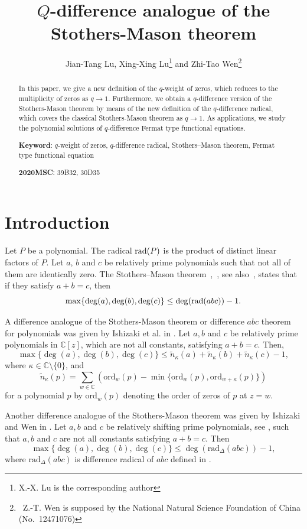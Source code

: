 \documentclass[a4paper,12pt]{article}
\title{$Q$-difference analogue of the Stothers-Mason theorem}
\author{Jian-Tang Lu, Xing-Xing Lu\footnote{X.-X. Lu is the corresponding author} and Zhi-Tao Wen\footnote{\ Z.-T. Wen is supposed by the National Natural Science Foundation of China (No.~12471076)}
 }
\date{}
\newcommand{\C}{\mathbb{C}}
\numberwithin{equation}{section}
\begin{document}
\maketitle

\begin{abstract}

In this paper, we give a new definition of the $q$-weight of zeros,  which reduces to the multiplicity of zeros as $q\to 1$. Furthermore, we obtain a $q$-difference version of the Stothers-Mason theorem by means of the new definition of the $q$-difference radical, which covers the classical Stothers-Mason theorem as $q\to 1$. As applications, we study the polynomial solutions of $q$-difference Fermat type functional equations.

\medskip
\noindent
\textbf{Keyword}: $q$-weight of zeros, $q$-difference radical, Stothers--Mason theorem, Fermat type functional equation

\medskip
\noindent
\textbf{2020MSC}: 39B32, 30D35

\end{abstract}

\section{Introduction}
Let $P$ be a polynomial. The radical ${\rm rad}(P)$ is the product of distinct linear factors of $P$. Let $a$, $b$ and $c$ be relatively prime polynomials such that not all of them are identically zero. The Stothers--Mason theorem~\cite{mason1984},~\cite{stothers1981}, see also~\cite{Snyder}, states that if they satisfy $a+b=c$, then
    $$
    \max\{\deg(a),\deg(b),\deg(c)\}\leq \deg({\rm rad}(abc))-1.
    $$

A difference analogue of the Stothers-Mason theorem or difference $abc$ theorem for polynomials was given by Ishizaki et al. in \cite[Theorem~3.1]{IKLT}. Let $a,b$ and $c$ be relatively prime polynomials in $\C[z]$, which are not all constants, satisfying $a+b=c$. Then,
    $$
    \max\{\deg(a),\deg(b),\deg(c)\}\leq \tilde{n}_\kappa(a)+\tilde{n}_\kappa(b)+\tilde{n}_\kappa(c)-1,
    $$
where $\kappa\in\C\setminus\{0\}$, and
    $$
    \tilde{n}_\kappa(p)=\sum_{w\in\C}(\text{ord}_w(p)-\min\{\text{ord}_w(p),\text{ord}_{w+\kappa}(p)\})
    $$
for a polynomial $p$ by $\text{ord}_w(p)$ denoting the order of zeros of $p$ at $z=w$.

Another difference analogue of the Stothers-Mason theorem was given by Ishizaki and Wen in \cite[Theorem~3.5]{IW2022}. Let $a, b$ and $c$ be relatively shifting prime polynomials, see \cite[pages~736-737]{IW2022}, such that $a, b$ and $c$ are not all constants satisfying $a+b=c$. Then
    $$
    \max\{\deg(a),\deg(b),\deg(c)\}\leq \deg(\text{rad}_\Delta(abc))-1,
    $$
where $\text{rad}_\Delta(abc)$ is difference radical of $abc$ defined in \cite{IW2022}.
\end{document}
